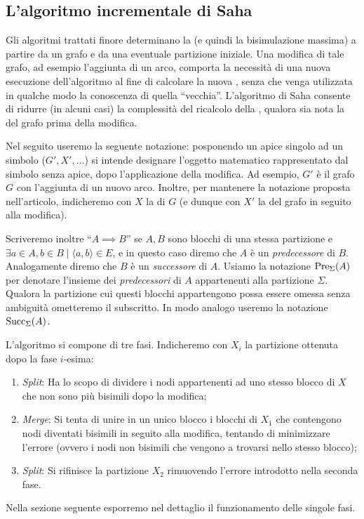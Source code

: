 \subsection{L'algoritmo incrementale di Saha}
\label{sec:saha}
Gli algoritmi trattati finore determinano la \rscpnomath (e quindi la bisimulazione massima) a partire da un grafo e da una eventuale partizione iniziale. Una modifica di tale grafo, ad esempio l'aggiunta di un arco, comporta la necessità di una nuova esecuzione dell'algoritmo al fine di calcolare la nuova \rscpnomath, senza che venga utilizzata in qualche modo la conoscenza di quella ``vecchia''. L'algoritmo di Saha \cite{saha} consente di ridurre (in alcuni casi) la complessità del ricalcolo della \rscpnomath, qualora sia nota la \rscpnomath del grafo prima della modifica.

Nel seguito useremo la seguente notazione: posponendo un apice singolo ad un simbolo ($G', X', \dots$) si intende designare l'oggetto matematico rappresentato dal simbolo senza apice, dopo l'applicazione della modifica. Ad esempio, $G'$ è il grafo $G$ con l'aggiunta di un nuovo arco. Inoltre, per mantenere la notazione proposta nell'articolo, indicheremo con $X$ la \rscpnomath di $G$ (e dunque con $X'$ la \rscpnomath del grafo in seguito alla modifica).

Scriveremo inoltre ``$A \implies B$'' se $A,B$ sono blocchi di una stessa partizione e $\exists a \in A, b \in B \mid \langle a, b\rangle \in E$, e in questo caso diremo che $A$ è un \emph{predecessore} di $B$. Analogamente diremo che $B$ è un \emph{successore} di $A$. Usiamo la notazione $\textup{Pre}_{\Sigma}(A)$ per denotare l'insieme dei \emph{predecessori} di $A$ appartenenti alla partizione $\Sigma$. Qualora la partizione cui questi blocchi appartengono possa essere omessa senza ambiguità ometteremo il subscritto. In modo analogo useremo la notazione $\textup{Succ}_{\Sigma}(A)$.

L'algoritmo si compone di tre fasi. Indicheremo con $X_i$ la partizione ottenuta dopo la fase $i$-esima:
\begin{enumerate}
    \item \emph{Split}: Ha lo scopo di dividere i nodi appartenenti ad uno stesso blocco di $X$ che non sono più bisimili dopo la modifica;
    \item \emph{Merge}: Si tenta di unire in un unico blocco i blocchi di $X_1$ che contengono nodi diventati bisimili in seguito alla modifica, tentando di minimizzare l'errore (ovvero i nodi non bisimili che vengono a trovarsi nello stesso blocco);
    \item \emph{Split}: Si rifinisce la partizione $X_2$ rimuovendo l'errore introdotto nella seconda fase.
\end{enumerate}
Nella sezione seguente esporremo nel dettaglio il funzionamento delle singole fasi.

